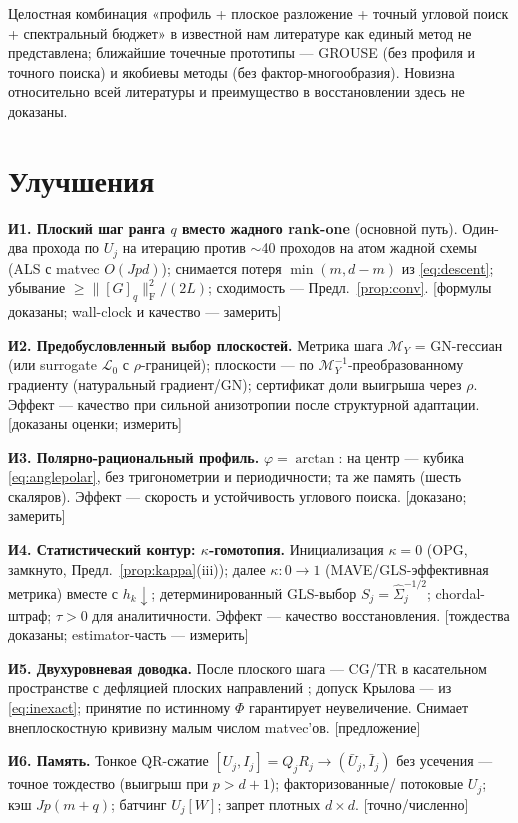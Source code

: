 \documentclass[11pt,a4paper]{article}
\newcommand{\F}{_{\mathrm F}}
\theoremstyle{remark}
\begin{document}
Целостная комбинация «профиль + плоское разложение + точный угловой поиск +
спектральный бюджет» в известной нам литературе как единый метод не
представлена; ближайшие точечные прототипы --- GROUSE (без профиля и
точного поиска) и якобиевы методы (без фактор-многообразия). Новизна
относительно всей литературы и преимущество в восстановлении здесь не
доказаны.

\section{Улучшения}\label{sec:improve}

\textbf{И1. Плоский шаг ранга $q$ вместо жадного rank-one} (основной путь).
Один-два прохода по $U_j$ на итерацию против $\sim$40 проходов на атом
жадной схемы (ALS с matvec $O(Jpd)$); снимается потеря
 $\min(m,d-m)$ из \eqref{eq:descent}; убывание $\ge\|[G]_q\|\F^2/(2L)$;
сходимость --- Предл.~\ref{prop:conv}. [формулы доказаны; wall-clock и
качество --- замерить]

\textbf{И2. Предобусловленный выбор плоскостей.} Метрика шага
 $\mathcal M_Y$ = GN-гессиан (или surrogate $\mathcal L_0$ с
 $\rho$-границей); плоскости --- по $\mathcal M_Y^{-1}$-преобразованному
градиенту (натуральный градиент/GN); сертификат доли выигрыша через
 $\rho$. Эффект --- качество при сильной анизотропии после структурной
адаптации. [доказаны оценки; измерить]

\textbf{И3. Полярно-рациональный профиль.} $\varphi=\arctan$: на центр ---
кубика \eqref{eq:anglepolar}, без тригонометрии и периодичности; та же
память (шесть скаляров). Эффект --- скорость и устойчивость углового
поиска. [доказано; замерить]

\textbf{И4. Статистический контур: $\kappa$-гомотопия.}
Инициализация $\kappa=0$ (OPG, замкнуто, Предл.~\ref{prop:kappa}(iii));
далее $\kappa\colon0\to1$ (MAVE/GLS-эффективная метрика) вместе с
 $h_k\downarrow$; детерминированный GLS-выбор $S_j=\hat\Sigma_j^{-1/2}$;
chordal-штраф; $\tau>0$ для аналитичности. Эффект --- качество
восстановления. [тождества доказаны; estimator-часть --- измерить]

\textbf{И5. Двухуровневая доводка.} После плоского шага --- CG/TR в
касательном пространстве с дефляцией плоских направлений \cite{defcg};
допуск Крылова --- из \eqref{eq:inexact}; принятие по истинному $\Phi$ гарантирует неувеличение. Снимает внеплоскостную кривизну малым числом
matvec'ов. [предложение]

\textbf{И6. Память.} Тонкое QR-сжатие $[U_j,I_j]=Q_jR_j\to(\bar U_j,\bar I_j)$ без усечения --- точное тождество (выигрыш при $p>d+1$); факторизованные/
потоковые $U_j$; кэш $Jp(m+q)$; батчинг $U_j[W]$; запрет плотных $d\times d$.
[точно/численно]
\end{document}
